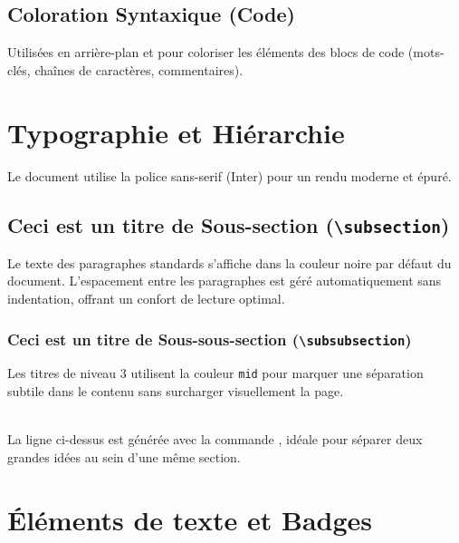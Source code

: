 \subsection{Coloration Syntaxique (Code)}
Utilisées en arrière-plan et pour coloriser les éléments des blocs de code (mots-clés, chaînes de caractères, commentaires).

\vspace{10pt}


\section{Typographie et Hiérarchie}

Le document utilise la police sans-serif (Inter) pour un rendu moderne et épuré.

\subsection{Ceci est un titre de Sous-section (\texttt{\textbackslash subsection})}
Le texte des paragraphes standards s'affiche dans la couleur noire par défaut du document. L'espacement entre les paragraphes est géré automatiquement sans indentation, offrant un confort de lecture optimal.

\subsubsection{Ceci est un titre de Sous-sous-section (\texttt{\textbackslash subsubsection})}
Les titres de niveau 3 utilisent la couleur \texttt{mid} pour marquer une séparation subtile dans le contenu sans surcharger visuellement la page. 

\vspace{10pt}
\hrulefull
\\La ligne ci-dessus est générée avec la commande , idéale pour séparer deux grandes idées au sein d'une même section.


\section{Éléments de texte et Badges}


